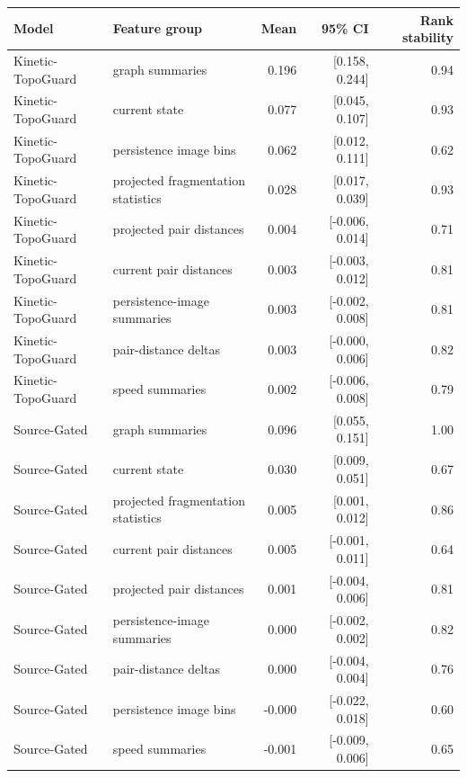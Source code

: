 \begin{tabular}{llrrr}
\toprule
Model & Feature group & Mean & 95\% CI & Rank stability \\
\midrule
Kinetic-TopoGuard & graph summaries & 0.196 & [0.158, 0.244] & 0.94 \\
Kinetic-TopoGuard & current state & 0.077 & [0.045, 0.107] & 0.93 \\
Kinetic-TopoGuard & persistence image bins & 0.062 & [0.012, 0.111] & 0.62 \\
Kinetic-TopoGuard & projected fragmentation statistics & 0.028 & [0.017, 0.039] & 0.93 \\
Kinetic-TopoGuard & projected pair distances & 0.004 & [-0.006, 0.014] & 0.71 \\
Kinetic-TopoGuard & current pair distances & 0.003 & [-0.003, 0.012] & 0.81 \\
Kinetic-TopoGuard & persistence-image summaries & 0.003 & [-0.002, 0.008] & 0.81 \\
Kinetic-TopoGuard & pair-distance deltas & 0.003 & [-0.000, 0.006] & 0.82 \\
Kinetic-TopoGuard & speed summaries & 0.002 & [-0.006, 0.008] & 0.79 \\
Source-Gated & graph summaries & 0.096 & [0.055, 0.151] & 1.00 \\
Source-Gated & current state & 0.030 & [0.009, 0.051] & 0.67 \\
Source-Gated & projected fragmentation statistics & 0.005 & [0.001, 0.012] & 0.86 \\
Source-Gated & current pair distances & 0.005 & [-0.001, 0.011] & 0.64 \\
Source-Gated & projected pair distances & 0.001 & [-0.004, 0.006] & 0.81 \\
Source-Gated & persistence-image summaries & 0.000 & [-0.002, 0.002] & 0.82 \\
Source-Gated & pair-distance deltas & 0.000 & [-0.004, 0.004] & 0.76 \\
Source-Gated & persistence image bins & -0.000 & [-0.022, 0.018] & 0.60 \\
Source-Gated & speed summaries & -0.001 & [-0.009, 0.006] & 0.65 \\
\bottomrule
\end{tabular}
